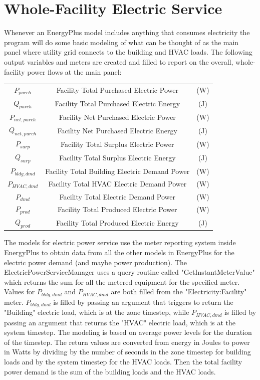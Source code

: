 \section{Whole-Facility Electric Service}\label{section-whole-facility-electric-service}

Whenever an EnergyPlus model includes anything that consumes electricity the program will do some basic modeling of what can be thought of as the main panel where utility grid connects to the building and HVAC loads.  The following output variables and meters are created and filled to report on the overall, whole-facility power flows at the main panel:

\begin{tabular}{c|c|c}
  ${P_{purch}}$ &    Facility Total Purchased Electric Power & (W) \tabularnewline
  ${Q_{purch}}$ &    Facility Total Purchased Electric Energy & (J) \tabularnewline
  ${P_{net,purch}}$ &    Facility Net Purchased Electric Power & (W) \tabularnewline
  ${Q_{net,purch}}$ &    Facility Net Purchased Electric Energy & (J) \tabularnewline
  ${P_{surp}}$ &    Facility Total Surplus Electric Power & (W) \tabularnewline
  ${Q_{surp}}$ &    Facility Total Surplus Electric Energy & (J) \tabularnewline
  ${P_{bldg,dmd}}$ &    Facility Total Building Electric Demand Power & (W) \tabularnewline
  ${P_{HVAC,dmd}}$ &    Facility Total HVAC Electric Demand Power & (W) \tabularnewline
  ${P_{dmd}}$ &    Facility Total Electric Demand Power & (W) \tabularnewline
  ${P_{prod}}$ &    Facility Total Produced Electric Power & (W) \tabularnewline
  ${Q_{prod}}$ &   Facility Total Produced Electric Energy & (J)
\end{tabular}

The models for electric power service use the meter reporting system inside EnergyPlus to obtain data from all the other models in EnergyPlus for the electric power demand (and maybe power production).  The ElectricPowerServiceManager uses a query routine called "GetInstantMeterValue" which returns the sum for all the metered equipment for the specified meter.  Values for $P_{bldg,dmd}$ and $P_{HVAC,dmd}$ are both filled from the "Electricity:Facility" meter.  $P_{bldg,dmd}$ is filled by passing an argument that triggers to return the "Building" electric load, which is at the zone timestep, while $P_{HVAC,dmd}$ is filled by passing an argument that returns the "HVAC" electric load, which is at the system timestep.  The modeling is based on average power levels for the duration of the timestep. The return values are converted from energy in Joules to power in Watts by dividing by the number of seconds in the zone timestep for building loads and by the system timestep for the HVAC loads.  Then the total facility power demand is the sum of the building loads and the HVAC loads.

